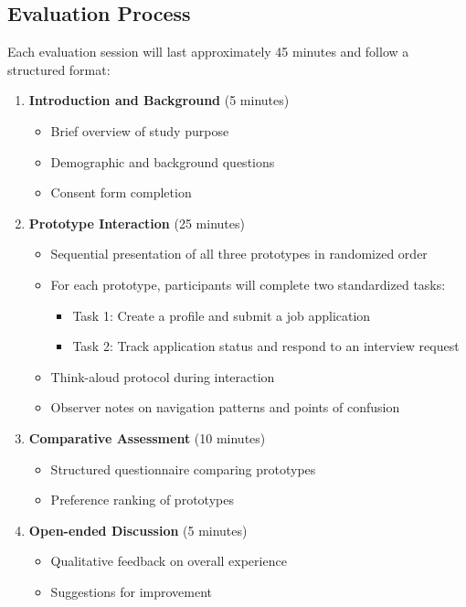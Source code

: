 \documentclass[
	letterpaper, %
]{jdf}
\begin{document}
\begin{sloppypar}
\subsection{Evaluation Process}

Each evaluation session will last approximately 45 minutes and follow a structured format:

\begin{enumerate}
    \item \textbf{Introduction and Background} (5 minutes)
    \begin{itemize}
        \item Brief overview of study purpose
        \item Demographic and background questions
        \item Consent form completion
    \end{itemize}
    
    \item \textbf{Prototype Interaction} (25 minutes)
    \begin{itemize}
        \item Sequential presentation of all three prototypes in randomized order
        \item For each prototype, participants will complete two standardized tasks:
        \begin{itemize}
            \item Task 1: Create a profile and submit a job application
            \item Task 2: Track application status and respond to an interview request
        \end{itemize}
        \item Think-aloud protocol during interaction
        \item Observer notes on navigation patterns and points of confusion
    \end{itemize}
    
    \item \textbf{Comparative Assessment} (10 minutes)
    \begin{itemize}
        \item Structured questionnaire comparing prototypes
        \item Preference ranking of prototypes
    \end{itemize}
    
    \item \textbf{Open-ended Discussion} (5 minutes)
    \begin{itemize}
        \item Qualitative feedback on overall experience
        \item Suggestions for improvement
    \end{itemize}
\end{enumerate}


\end{sloppypar}
\end{document}
